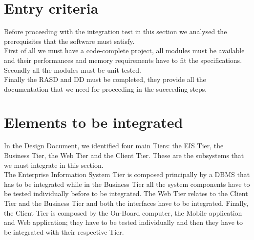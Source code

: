 \section{Entry criteria}
Before proceeding with the integration test in this section we analysed the prerequisites that the software must satisfy.
\\First of all we must have a code-complete project, all modules must be available and their performances and memory requirements have to fit the specifications.
\\Secondly all the modules must be unit tested. 
\\Finally the RASD and DD must be completed, they provide all the documentation that we need for proceeding in the succeeding steps.

\section{Elements to be integrated}
In the Design Document, we identified four main Tiers: the EIS Tier, the Business Tier, the Web Tier and the Client Tier. These are the subsystems that we must integrate in this section.
\\The Enterprise Information System Tier is composed principally by a DBMS that has to be integrated while in the Business Tier all the system components have to be tested individually before to be integrated. The Web Tier relates to the Client Tier and the Business Tier and both the interfaces have to be integrated. Finally, the Client Tier is composed by the On-Board computer, the Mobile application and Web application; they have to be tested individually and then they have to be integrated with their respective Tier. 

